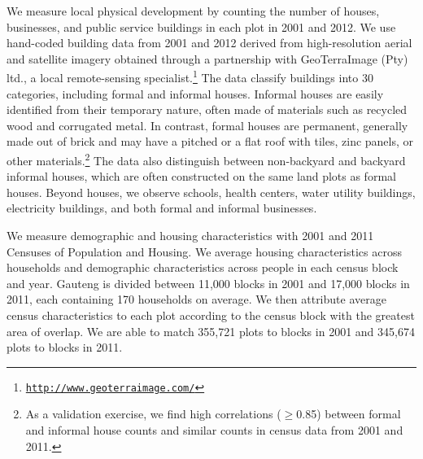 \documentclass[12pt]{article}
\begin{document}
We measure local physical development by counting the number of houses, businesses, and public service buildings in each plot in 2001 and 2012.  We use hand-coded building data from 2001 and 2012 derived from high-resolution aerial and satellite imagery obtained through a partnership with GeoTerraImage (Pty) ltd., a local remote-sensing specialist.\footnote{\href{http://www.geoterraimage.com/}{\tt http://www.geoterraimage.com/}} The data classify buildings into 30 categories, including formal and informal houses. Informal houses are easily identified from their temporary nature, often made of materials such as recycled wood and corrugated metal. In contrast, formal houses are permanent, generally made out of brick and may have a pitched or a flat roof with tiles, zinc panels, or other materials.\footnote{As a validation exercise, we find high correlations ($\geq$0.85) between formal and informal house counts and similar counts in census data from 2001 and 2011.}  The data also distinguish between non-backyard and backyard informal houses, which are often constructed on the same land plots as formal houses.  Beyond houses, we observe schools, health centers, water utility buildings, electricity buildings, and both formal and informal businesses.  



We measure demographic and housing characteristics with 2001 and 2011 Censuses of Population and Housing.  We average housing characteristics across households and demographic characteristics across people in each census block and year.  Gauteng is divided between 11,000 blocks in 2001 and 17,000 blocks in 2011, each containing 170 households on average.  We then attribute average census characteristics to each plot according to the census block with the greatest area of overlap.  We are able to match 355,721 plots to blocks in 2001 and 345,674 plots to blocks in 2011.
\end{document}
